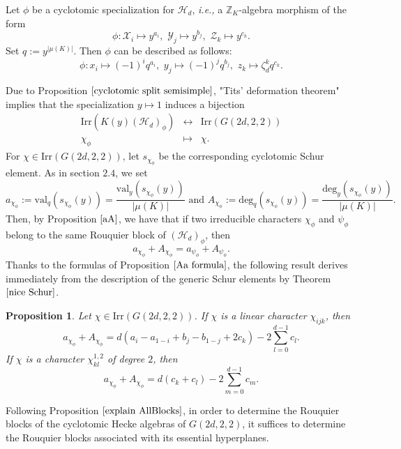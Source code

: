 \documentclass[10pt,a4paper,titlepage]{article}
\newtheorem{proposition}[theorem]{Proposition}
\newcommand{\ie}{\emph{i.e., }}
\begin{document}
Let $\phi$ be a cyclotomic specialization for $\mathcal{H}_d$, \ie a $\mathbb{Z}_K$-algebra morphism of the form
$$\phi: \mathcal{X}_i \mapsto y^{a_i}, \,\,
 \mathcal{Y}_j \mapsto y^{b_j}, \,\,
 \mathcal{Z}_k \mapsto y^{c_k}.$$ 
Set $q:=y^{|\mu(K)|}$. Then $\phi$ can be described as follows:
$$\phi: x_i \mapsto (-1)^iq^{a_i}, \,\,
 y_j \mapsto (-1)^jq^{b_j}, \,\,
 z_k \mapsto \zeta_d^kq^{c_k}.$$ 

Due to Proposition $\ref{cyclotomic split semisimple}$, "Tits' deformation theorem" implies that the specialization $y \mapsto 1$ induces a bijection
$$\begin{array}{ccc}
   \textrm{Irr}(K(y)(\mathcal{H}_d)_\phi) & \leftrightarrow & \textrm{Irr}(G(2d,2,2)) \\
  \chi_{\phi} & \mapsto & \chi.
  \end{array}$$
For $\chi \in \mathrm{Irr}(G(2d,2,2))$, let $s_{\chi_\phi}$  be the corresponding cyclotomic Schur element.
As in section $2.4$, we set
$$a_{\chi_\phi}:=\mathrm{val}_q(s_{\chi_\phi}(y))=\frac{\mathrm{val}_y(s_{\chi_\phi}(y))}{|\mu(K)|} \textrm{ and }
A_{\chi_\phi}:=\mathrm{deg}_q(s_{\chi_\phi}(y))=\frac{\mathrm{deg}_y(s_{\chi_\phi}(y))}{|\mu(K)|} .$$
Then, by Proposition $\ref{aA}$, we have that if two irreducible characters 
 $\chi_\phi$ and $\psi_\phi$ belong to the same Rouquier block of $(\mathcal{H}_d)_\phi$, then
        $$a_{\chi_\phi}+A_{\chi_\phi}=a_{\psi_\phi}+A_{\psi_\phi}.$$
Thanks to the formulas of Proposition $\ref{Aa formula}$, the following result derives immediately from the description of the generic Schur elements by Theorem $\ref{nice Schur}$.

\begin{proposition}\label{values of aA}
Let $\chi \in \mathrm{Irr}(G(2d,2,2))$. If $\chi$ is a linear character $\chi_{ijk}$, then
$$a_{\chi_\phi}+A_{\chi_\phi}=d(a_i-a_{1-i}+b_j-b_{1-j}+2c_k)-2\sum_{l=0}^{d-1}c_l.$$
If $\chi$ is a character $\chi_{kl}^{1,2}$ of degree $2$, then
$$a_{\chi_\phi}+A_{\chi_\phi}=d(c_k+c_l)-2 \sum_{m=0}^{d-1}c_m.$$
\end{proposition}

Following Proposition $\ref{explain AllBlocks}$, in order to determine the Rouquier blocks of the cyclotomic Hecke algebras of $G(2d,2,2)$, it suffices to determine the Rouquier blocks associated with its essential hyperplanes. 
\end{document}
